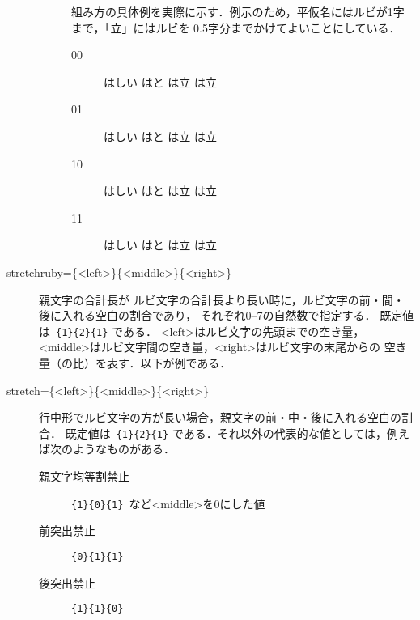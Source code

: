 \documentclass[a4paper,10pt]{ltjsarticle}
\begin{document}
\begin{description}
\begin{description}
組み方の具体例を実際に示す．例示のため，平仮名にはルビが1字まで，「立」にはルビを
0.5字分までかけてよいことにしている．
\begin{description}
\item[00]{%
%
はしい
  \quad はと\quad
は立\quad
は立\par}
\item[01]{%
%
はしい
  \quad はと\quad
は立\quad
は立\par}
\item[10]{%
%
はしい
  \quad はと\quad
は立\quad
は立\par}
\item[11]{%
%
はしい\quad
はと\quad
は立\quad
は立\par}
\end{description} 

\end{description}
\item[stretchruby=\{<left>\}\{<middle>\}\{<right>\}] 親文字の合計長が
ルビ文字の合計長より長い時に，ルビ文字の前・間・後に入れる空白の割合であり，
それぞれ0--7の自然数で指定する．
既定値は\ \verb+{1}{2}{1}+ である．
<left>はルビ文字の先頭までの空き量，<middle>はルビ文字間の空き量，<right>はルビ文字の末尾からの
空き量（の比）を表す．以下が例である．
\begin{LTXexample}[width=0.3\textwidth, preset=\Large]
\end{LTXexample}
\item[stretch=\{<left>\}\{<middle>\}\{<right>\}]
行中形でルビ文字の方が長い場合，親文字の前・中・後に入れる空白の割合．
既定値は\ \verb+{1}{2}{1}+ である．それ以外の代表的な値としては，例えば次のようなものがある．
\begin{description}
\item[親文字均等割禁止] \verb+{1}{0}{1}+\ など<middle>を0にした値
\item[前突出禁止] \verb+{0}{1}{1}+
\item[後突出禁止] \verb+{1}{1}{0}+
\end{description}


\end{description}
\end{document}
